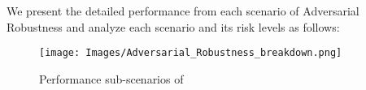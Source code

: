 We present the detailed performance from each scenario of Adversarial Robustness and analyze each scenario and its risk levels as follows:
\begin{figure*}[h]
    \centering
    \texttt{[image: Images/Adversarial\_Robustness\_breakdown.png]}
    \vspace{-0.5in}
    \caption{Performance sub-scenarios of \llm}
\label{fig:adv-radar}
\end{figure*} 